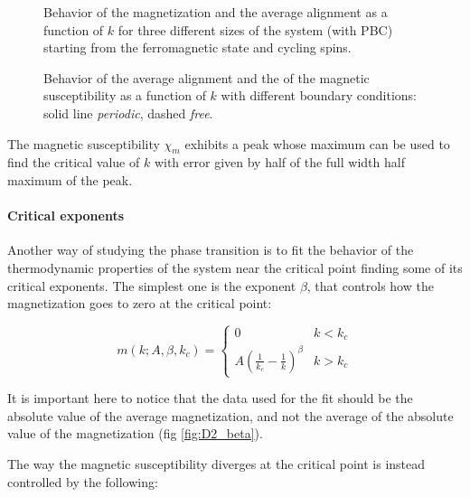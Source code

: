 \documentclass[a4paper, 11pt]{article}
\begin{document}
    \begin{figure}[H]
      \centering
      \caption{Behavior of the magnetization and the average alignment as a function of $k$ for three different sizes of the system (with PBC) starting from the ferromagnetic state and cycling spins.}
      \label{fig:D2_size_dependent}
    \end{figure}

    \begin{figure}[H]
      \centering
      \caption{Behavior of the average alignment and the of the magnetic susceptibility as a function of $k$ with different boundary conditions: solid line \emph{periodic}, dashed \emph{free}.}
      \label{fig:D2_achi}
    \end{figure}

    The magnetic susceptibility $\chi_m$ exhibits a peak whose maximum can be used to find the critical value of $k$ with error given by half of the full width half maximum of the peak.

    \paragraph{Critical exponents}
    Another way of studying the phase transition is to fit the behavior of the thermodynamic properties of the system near the critical point finding some of its critical exponents.
    The simplest one is the exponent $\beta$, that controls how the magnetization goes to zero at the critical point:

    \begin{equation}
      m(k;A,\beta,k_c) = \begin{cases}
        0 & k < k_c \\
        A \left(\frac{1}{k_c} - \frac{1}{k} \right)^\beta & k > k_c
      \end{cases}
    \end{equation}

    It is important here to notice that the data used for the fit should be the absolute value of the average magnetization, and not the average of the absolute value of the magnetization (fig \ref{fig:D2_beta}).

    The way the magnetic susceptibility diverges at the critical point is instead controlled by the following:
\end{document}
